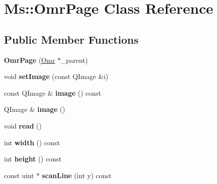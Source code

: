 \hypertarget{class_ms_1_1_omr_page}{}\section{Ms\+:\+:Omr\+Page Class Reference}
\label{class_ms_1_1_omr_page}
\subsection*{Public Member Functions}
\begin{DoxyCompactItemize}
\item 
\mbox{\label{class_ms_1_1_omr_page_af28528c793b71533414a8f0dcb9c5fb3}} 
{\bfseries Omr\+Page} (\hyperlink{class_ms_1_1_omr}{Omr} $\ast$\+\_\+parent)
\item 
\mbox{\label{class_ms_1_1_omr_page_a45f464bf9f5441149ae7e228aa8739af}} 
void {\bfseries set\+Image} (const Q\+Image \&i)
\item 
\mbox{\label{class_ms_1_1_omr_page_acb866f3bf431e42d10837752acfaa061}} 
const Q\+Image \& {\bfseries image} () const
\item 
\mbox{\label{class_ms_1_1_omr_page_a0ad61d1758ad718e966c48a01e9ea0ed}} 
Q\+Image \& {\bfseries image} ()
\item 
\mbox{\label{class_ms_1_1_omr_page_a2b294d6a78634b3161245a7399851cdf}} 
void {\bfseries read} ()
\item 
\mbox{\label{class_ms_1_1_omr_page_a7281f1a7c6b9b930439e059c5431ad75}} 
int {\bfseries width} () const
\item 
\mbox{\label{class_ms_1_1_omr_page_ae8dec5bb3388103135ae04dd66e3ee8d}} 
int {\bfseries height} () const
\item 
\mbox{\label{class_ms_1_1_omr_page_ab4615aaa192b83c41c47b67a7114e948}} 
const uint $\ast$ {\bfseries scan\+Line} (int y) const
\item 
\mbox{\label{class_ms_1_1_omr_page_a7e2db035774ee2d091dadb3fed07718d}} 

\end{DoxyCompactItemize}
